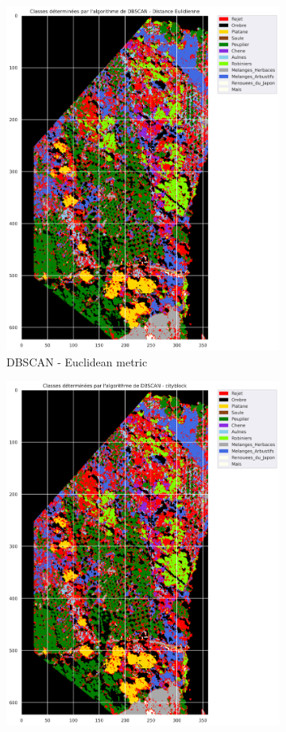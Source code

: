 \documentclass{siamart171218}
\begin{document}
\begin{figure}[h!]
\begin{subfigure}[b]{0.33\textwidth}
                \includegraphics[width=0.9\linewidth]{images/Classes_clustering_Euc.png}
                \caption{DBSCAN - Euclidean metric}
                \label{DBSCAN_euc}
        \end{subfigure}%
        \begin{subfigure}[b]{0.33\textwidth}
                \centering
                \includegraphics[width=0.9\linewidth]{images/Classes_clustering_cityblock.png}

\end{subfigure}
\end{figure}
\end{document}
